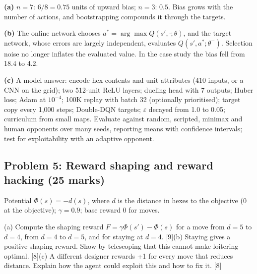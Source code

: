 \documentclass[11pt]{article}
\begin{document}
\begin{soln}\textbf{(a)} $n=7$: $6/8=\mathbf{0.75}$ units of upward bias; $n=3$: $\mathbf{0.5}$. Bias grows with the number of actions, and bootstrapping compounds it through the targets.

\textbf{(b)} The online network chooses $a^*=\arg\max Q(s',\cdot;\theta)$, and the target network, whose errors are largely independent, evaluates $Q(s',a^*;\theta^-)$. Selection noise no longer inflates the evaluated value. In the case study the bias fell from 18.4 to 4.2.

\textbf{(c)} A model answer: encode hex contents and unit attributes (410 inputs, or a CNN on the grid); two 512-unit ReLU layers; dueling head with 7 outputs; Huber loss; Adam at $10^{-4}$; 100K replay with batch 32 (optionally prioritised); target copy every 1,000 steps; Double-DQN targets; $\varepsilon$ decayed from 1.0 to 0.05; curriculum from small maps. Evaluate against random, scripted, minimax and human opponents over many seeds, reporting means with confidence intervals; test for exploitability with an adaptive opponent.\end{soln}

\subsection{Problem 5: Reward shaping and reward hacking \normalfont\small\color{GreyN}(25 marks)}

\begin{prob}Potential $\Phi(s)=-d(s)$, where $d$ is the distance in hexes to the objective (0 at the objective); $\gamma=0.9$; base reward 0 for moves.

(a) Compute the shaping reward $F=\gamma\Phi(s')-\Phi(s)$ for a move from $d=5$ to $d=4$, from $d=4$ to $d=5$, and for staying at $d=4$. [9]\newline (b) Staying gives a positive shaping reward. Show by telescoping that this cannot make loitering optimal. [8]\newline (c) A different designer rewards +1 for every move that reduces distance. Explain how the agent could exploit this and how to fix it. [8]\end{prob}
\end{document}
